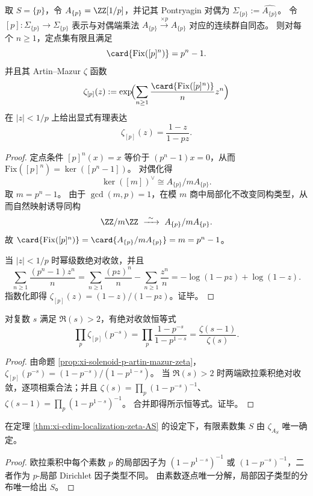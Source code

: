 \begin{proposition}\label{prop:xi-solenoid-p-artin-mazur-zeta}
取 \(S=\{p\}\)，令 \(A_{\{p\}}=\ZZ[1/p]\)，并记其 Pontryagin 对偶为 \(\Sigma_{\{p\}}:=\widehat{A_{\{p\}}}\)。
令 \([p]:\Sigma_{\{p\}}\to \Sigma_{\{p\}}\) 表示与对偶端乘法 \(A_{\{p\}}\xrightarrow{\times p}A_{\{p\}}\) 对应的连续群自同态。
则对每个 \(n\ge 1\)，定点集有限且满足
\[
\card{\mathrm{Fix}([p]^n)}=p^n-1.
\]
并且其 Artin--Mazur \(\zeta\) 函数
\[
\zeta_{[p]}(z)
:=\exp\!\Bigl(\sum_{n\ge 1}\frac{\card{\mathrm{Fix}([p]^n)}}{n}z^n\Bigr)
\]
在 \(|z|<1/p\) 上给出显式有理表达
\[
\zeta_{[p]}(z)=\frac{1-z}{1-pz}.
\]
\end{proposition}
\begin{proof}
定点条件 \([p]^n(x)=x\) 等价于 \((p^n-1)x=0\)，从而
\(
\mathrm{Fix}([p]^n)=\ker([p^n-1])
\)。
对偶化得
\[
\ker([m])^\vee\cong A_{\{p\}}/mA_{\{p\}}.
\]
取 \(m=p^n-1\)。
由于 \(\gcd(m,p)=1\)，在模 \(m\) 商中局部化不改变同构类型，从而自然映射诱导同构
\[
\ZZ/m\ZZ\ \xrightarrow{\ \sim\ }\ A_{\{p\}}/mA_{\{p\}}.
\]
故 \(\card{\mathrm{Fix}([p]^n)}=\card{A_{\{p\}}/mA_{\{p\}}}=m=p^n-1\)。
\par
当 \(|z|<1/p\) 时幂级数绝对收敛，并且
\[
\sum_{n\ge 1}\frac{(p^n-1)z^n}{n}
=\sum_{n\ge 1}\frac{(pz)^n}{n}-\sum_{n\ge 1}\frac{z^n}{n}
=-\log(1-pz)+\log(1-z).
\]
指数化即得 \(\zeta_{[p]}(z)=(1-z)/(1-pz)\)。证毕。
\end{proof}

\begin{corollary}[欧拉乘积的动力学实现]\label{cor:xi-artin-mazur-euler-product-zeta-ratio}
对复数 \(s\) 满足 \(\Re(s)>2\)，有绝对收敛恒等式
\[
\prod_{p}\zeta_{[p]}(p^{-s})
=\prod_{p}\frac{1-p^{-s}}{1-p^{1-s}}
=\frac{\zeta(s-1)}{\zeta(s)}.
\]
\end{corollary}
\begin{proof}
由命题 \ref{prop:xi-solenoid-p-artin-mazur-zeta}，\(\zeta_{[p]}(p^{-s})=(1-p^{-s})/(1-p^{1-s})\)。
当 \(\Re(s)>2\) 时两端欧拉乘积绝对收敛，逐项相乘合法；并且
\(
\zeta(s)=\prod_p(1-p^{-s})^{-1}
\)、\(
\zeta(s-1)=\prod_p(1-p^{1-s})^{-1}
\)。
合并即得所示恒等式。证毕。
\end{proof}

\begin{corollary}[局部因子类型的可逆性]\label{cor:xi-cdim-localization-zeta-recovers-S}
在定理 \ref{thm:xi-cdim-localization-zeta-AS} 的设定下，有限素数集 \(S\) 由 \(\zeta_{A_S}\) 唯一确定。
\end{corollary}
\begin{proof}
欧拉乘积中每个素数 \(p\) 的局部因子为
\(
(1-p^{1-s})^{-1}
\)
或
\(
(1-p^{-s})^{-1}
\)，二者作为 \(p\)-局部 Dirichlet 因子类型不同。
由素数逐点唯一分解，局部因子类型的分布唯一给出 \(S\)。
\end{proof}

